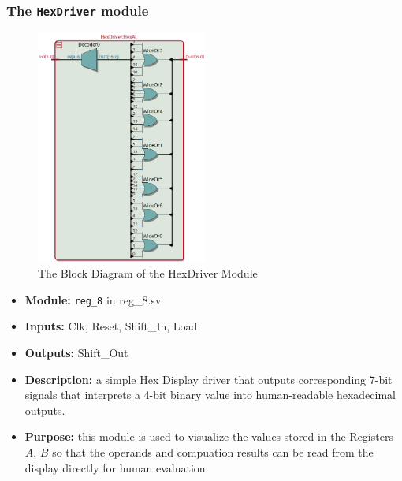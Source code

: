 \documentclass{article}
\begin{document}
\subsubsection{The \texttt{HexDriver} module}
\begin{figure}[h]
    \centering
    \includegraphics[width=0.5\textwidth]{hex_driver.png}
    \caption{The Block Diagram of the HexDriver Module}
    \label{fig:hex_driver}
\end{figure}

\begin{itemize}
    \item \textbf{Module:} \texttt{reg\_8} in reg\_8.sv
    \item \textbf{Inputs:} Clk, Reset, Shift\_In, Load
    \item \textbf{Outputs:} Shift\_Out
    \item \textbf{Description:} a simple Hex Display driver that outputs corresponding 7-bit signals that interprets a 4-bit binary value into human-readable hexadecimal outputs.
    \item \textbf{Purpose:} this module is used to visualize the values stored in the Registers $A$, $B$ so that the operands and compuation results can be read from the display directly for human evaluation.
\end{itemize}
\end{document}
